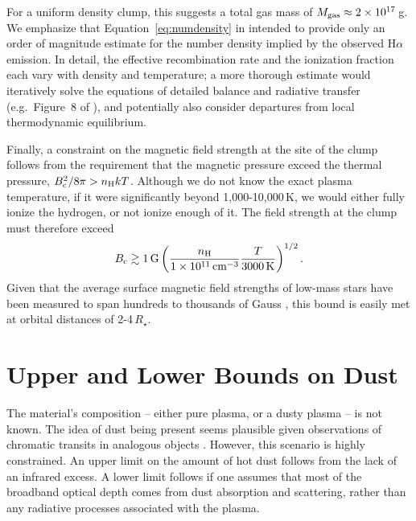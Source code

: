 \documentclass[11pt,twocolumn,tighten,linenumbers]{aastex7}
\begin{document}
For a uniform density clump, this suggests a total gas mass of $M_{\rm
gas}\approx 2\times10^{17}$\,g.  We emphasize that
Equation~\ref{eq:numdensity} in intended to provide only an order of
magnitude estimate for the number density implied by the observed
H$\alpha$ emission.  In detail, the effective recombination rate and
the ionization fraction each vary with density and temperature; a more
thorough estimate would iteratively solve the equations of detailed
balance and radiative transfer (e.g.~Figure~8 of \citealt{CollierCameron1989}),
and potentially also consider departures from local thermodynamic equilibrium.

Finally, a constraint on the magnetic field strength at the site of
the clump follows from the requirement that the magnetic pressure
exceed the thermal pressure, $B_{\rm c}^2 / 8\pi > n_{\rm H} k T$.
Although we do not know the exact plasma temperature, if it were
significantly beyond 1,000-10,000\,K, we would either fully ionize the
hydrogen, or not ionize enough of it.  The field strength at the clump
must therefore exceed
\begin{equation}
  B_{\rm c} \gtrsim 1\,{\rm G}
  \left(
  \frac{n_{\rm H}}{1\times10^{11}\,{\rm cm}^{-3}}
  \frac{T}{3000\,{\rm K}}
  \right)^{1/2}.
\end{equation}
Given that the average surface magnetic field strengths of low-mass
stars have been measured to span hundreds to thousands of Gauss
\citep{Donati2009,Kochukhov2021,Reiners2022}, this bound is easily met
at orbital distances of 2-4\,$R_\star$.

\section{Upper and Lower Bounds on Dust}
\label{subsec:dust}

The material's composition -- either pure plasma, or a dusty plasma --
is not known.  The idea of dust being present seems plausible given
observations of chromatic transits in analogous objects
\citep{Tanimoto2020,Gunther2022,Koen2023}.  However, this scenario is
highly constrained.  An upper limit on the amount of hot dust follows
from the lack of an infrared excess.  A lower limit follows if one
assumes that most of the broadband optical depth comes from dust
absorption and scattering, rather than any radiative processes
associated with the plasma.
\end{document}
